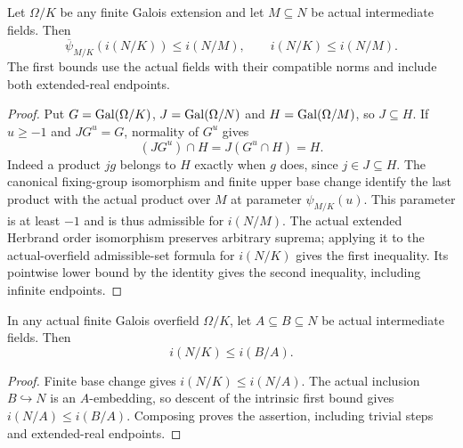 \begin{lemma}
\label{fw:finite-overfield-first-bound-base-change}
\leanok
Let $\Omega/K$ be any finite Galois extension and let
$M\subseteq N$ be actual intermediate fields. Then
\[
 \overline\psi_{M/K}(i(N/K))\leq i(N/M),\qquad
 i(N/K)\leq i(N/M).
\]
The first bounds use the actual fields with their compatible
norms and include both extended-real endpoints.
\end{lemma}
\begin{proof}
Put $G=\operatorname{Gal}(\Omega/K)$, $J=\operatorname{Gal}(\Omega/N)$ and
$H=\operatorname{Gal}(\Omega/M)$, so $J\subseteq H$. If $u\geq-1$ and
$JG^u=G$, normality of $G^u$ gives
\[
 (JG^u)\cap H=J(G^u\cap H)=H.
\]
Indeed a product $jg$ belongs to $H$ exactly when $g$ does,
since $j\in J\subseteq H$. The canonical fixing-group
isomorphism and finite upper base change identify the last
product with the actual product over $M$ at parameter
$\psi_{M/K}(u)$. This parameter is at least $-1$ and is thus
admissible for $i(N/M)$. The actual extended Herbrand order
isomorphism preserves arbitrary suprema; applying it to the
actual-overfield admissible-set formula for $i(N/K)$ gives
the first inequality. Its pointwise lower bound by the identity
gives the second inequality, including infinite endpoints.
\end{proof}

\begin{corollary}
\label{fw:finite-overfield-step-first-bound}
\leanok
In any actual finite Galois overfield $\Omega/K$, let
$A\subseteq B\subseteq N$ be actual intermediate fields. Then
\[
 i(N/K)\leq i(B/A).
\]
\end{corollary}
\begin{proof}
Finite base change gives $i(N/K)\leq i(N/A)$.
The actual inclusion $B\hookrightarrow N$ is an $A$-embedding,
so descent of the intrinsic first bound gives
$i(N/A)\leq i(B/A)$. Composing proves the assertion, including
trivial steps and extended-real endpoints.
\end{proof}

